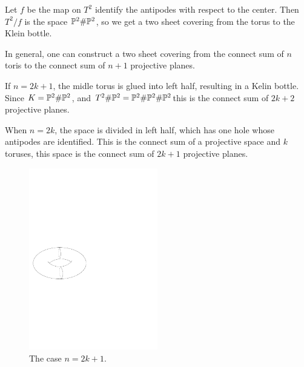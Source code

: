 \begin{example}\label{tori cover proj}
Let $f$ be the map on $T^2$ identify the antipodes with respect to the center. Then $T^2/f$ is the space $\P^2\#\P^2$, so we get a two sheet covering from the torus to the Klein bottle.\par
In general, one can construct a two sheet covering from the connect sum of $n$ toris to the connect sum of $n+1$ projective planes.\par
If $n=2k+1$, the midle torus is glued into left half, resulting in a Kelin bottle. Since $K=\P^2\#\P^2$, and $T^2\#\P^2=\P^2\#\P^2\#\P^2$this is the connect sum of $2k+2$ projective planes.\par
When $n=2k$, the space is divided in left half, which has one hole whose antipodes are identified. This is the connect sum of a projective space and $k$ toruses, this space is the connect sum of $2k+1$ projective planes.
\begin{figure}[htbp]
\centering
\begin{minipage}{200pt}
\centering
\includegraphics[width=0.5\textwidth]{cover-by-tori-1}
\caption{The case $n=2k+1$.}
\end{minipage}
\hspace{20pt}
\begin{minipage}{200pt}
\centering

\end{minipage}
\end{figure}
\end{example}
